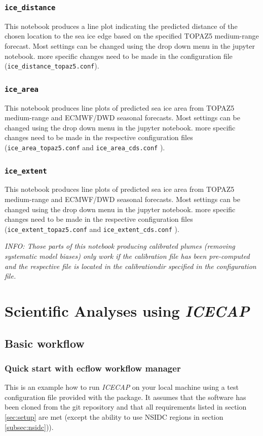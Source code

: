 \documentclass[DIV=10, parskip=full]{scrreprt}
\newcommand{\ice}{\textit{ICECAP}\xspace}
\newcommand{\info}[1]{\textit{INFO: #1}}
\begin{document}
\subsection{\texttt{ice\_distance}}
This notebook produces a line plot indicating the predicted distance of the chosen location to the sea ice edge based on the specified TOPAZ5 medium-range forecast. Most settings can be changed using the drop down menu in the jupyter notebook. more specific changes need to be made in the configuration file (\texttt{ice\_distance\_topaz5.conf}).

\subsection{\texttt{ice\_area}}
This notebook produces line plots of predicted sea ice area from TOPAZ5 medium-range and ECMWF/DWD seasonal forecasts. Most settings can be changed using the drop down menu in the jupyter notebook. more specific changes need to be made in the respective configuration files (\texttt{ice\_area\_topaz5.conf} and \texttt{ice\_area\_cds.conf} ).

\subsection{\texttt{ice\_extent}}
This notebook produces line plots of predicted sea ice area from TOPAZ5 medium-range and ECMWF/DWD seasonal forecasts. Most settings can be changed using the drop down menu in the jupyter notebook. more specific changes need to be made in the respective configuration files (\texttt{ice\_extent\_topaz5.conf} and \texttt{ice\_extent\_cds.conf} ).

\info{Those parts of this notebook producing calibrated plumes (removing systematic model biases) only work if the calibration file has been pre-computed and the respective file is located in the calibrationdir specified in the configuration file.}\\

\chapter{Scientific Analyses using \ice}
\section{Basic workflow}
\subsection{Quick start with ecflow workflow manager} \label{sec:quick_start}
This is an example how to run \ice on your local machine using a test configuration file provided with the package. It assumes that the software has been cloned from the git repository and that all requirements listed in section \ref{sec:setup} are met (except the ability to use NSIDC regions in section \ref{subsec:nsidc})).
\end{document}
